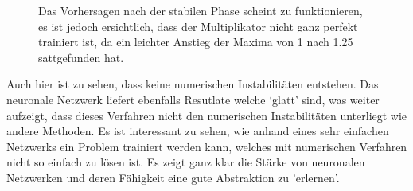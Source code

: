 \begin{figure}
\begin{tabular}{ccc}
	\end{tabular}
	\label{fig:mst_burgers_predict_2}
	\caption{Das Vorhersagen nach der stabilen Phase scheint zu funktionieren, es ist jedoch ersichtlich, dass der Multiplikator nicht ganz perfekt trainiert ist, da ein leichter Anstieg der Maxima von 1 nach 1.25 sattgefunden hat.}
\end{figure}

Auch hier ist zu sehen, dass keine numerischen Instabilitäten entstehen. Das neuronale Netzwerk liefert ebenfalls Resutlate welche `glatt' sind, was weiter aufzeigt, dass dieses Verfahren nicht den numerischen Instabilitäten unterliegt wie andere Methoden. Es ist interessant zu sehen, wie anhand eines sehr einfachen Netzwerks ein Problem trainiert werden kann, welches mit numerischen Verfahren nicht so einfach zu lösen ist. Es zeigt ganz klar die Stärke von neuronalen Netzwerken und deren Fähigkeit eine gute Abstraktion zu 'erlernen'.